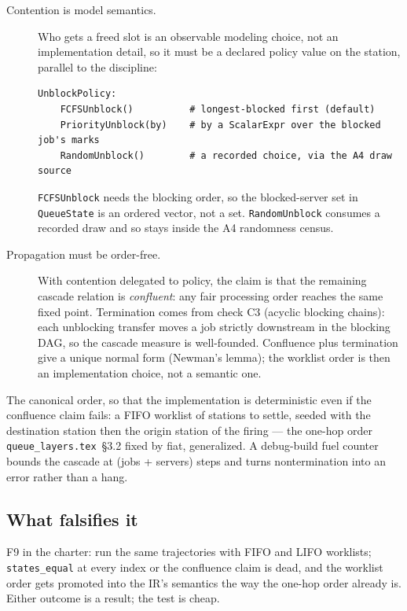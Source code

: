 \documentclass[11pt]{article}
\newcommand{\code}[1]{\texttt{#1}}
\begin{document}
\begin{description}
\item[Contention is model semantics.] Who gets a freed slot is an observable
  modeling choice, not an implementation detail, so it must be a declared
  policy value on the station, parallel to the discipline:
\begin{lstlisting}
UnblockPolicy:
    FCFSUnblock()          # longest-blocked first (default)
    PriorityUnblock(by)    # by a ScalarExpr over the blocked job's marks
    RandomUnblock()        # a recorded choice, via the A4 draw source
\end{lstlisting}
  \code{FCFSUnblock} needs the blocking order, so the blocked-server set in
  \code{QueueState} is an ordered vector, not a set. \code{RandomUnblock}
  consumes a recorded draw and so stays inside the A4 randomness census.
\item[Propagation must be order-free.] With contention delegated to policy,
  the claim is that the remaining cascade relation is \emph{confluent}: any
  fair processing order reaches the same fixed point. Termination comes from
  check C3 (acyclic blocking chains): each unblocking transfer moves a job
  strictly downstream in the blocking DAG, so the cascade measure is
  well-founded. Confluence plus termination give a unique normal form
  (Newman's lemma); the worklist order is then an implementation choice, not
  a semantic one.
\end{description}

The canonical order, so that the implementation is deterministic even if the
confluence claim fails: a FIFO worklist of stations to settle, seeded with
the destination station then the origin station of the firing --- the
one-hop order \code{queue\_layers.tex}~\S3.2 fixed by fiat, generalized. A
debug-build fuel counter bounds the cascade at (jobs + servers) steps and
turns nontermination into an error rather than a hang.

\subsection{What falsifies it}

F9 in the charter: run the same trajectories with FIFO and LIFO worklists;
\code{states\_equal} at every index or the confluence claim is dead, and the
worklist order gets promoted into the IR's semantics the way the one-hop
order already is. Either outcome is a result; the test is cheap.

\end{document}
